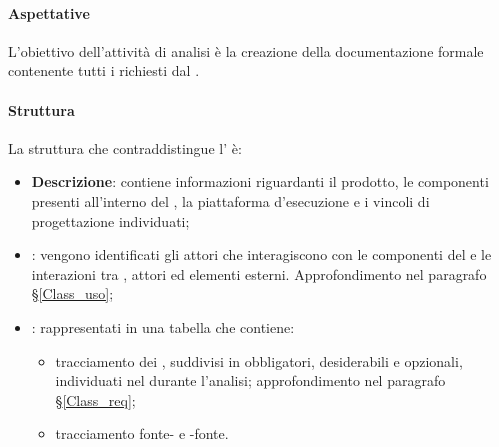 \paragraph{Aspettative}
L'obiettivo dell'attività di analisi è la creazione della documentazione formale contenente tutti i  richiesti dal .
\paragraph{Struttura}
La struttura che contraddistingue l'\AdR{} è:
\begin{itemize}
	\item \textbf{Descrizione}: contiene informazioni riguardanti il prodotto, le componenti presenti all'interno del , la piattaforma d'esecuzione e i vincoli di progettazione individuati;
	\item \textbf{}: vengono identificati gli attori che interagiscono con le componenti del  e le interazioni tra , attori ed elementi esterni. Approfondimento nel paragrafo \S{}\ref{Class_uso};
	\item \textbf{}: rappresentati in una tabella che contiene:
	\begin{itemize}
 		\item tracciamento dei , suddivisi in obbligatori, desiderabili e opzionali, individuati nel  durante l'analisi; approfondimento nel paragrafo \S{}\ref{Class_req};
		\item tracciamento fonte- e -fonte. 
	\end{itemize}
\end{itemize}
